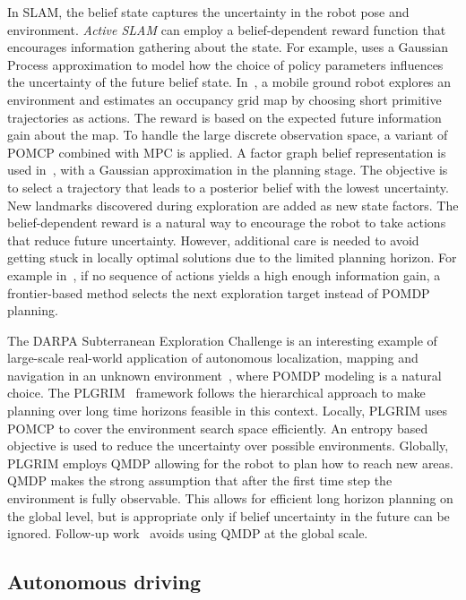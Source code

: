 \documentclass[journal]{IEEEtran}
\begin{document}
In SLAM, the belief state captures the uncertainty in the robot pose and environment.
\emph{Active SLAM} can employ a belief-dependent reward  function that encourages
information gathering about the state. For example, \cite{martinez2009bayesian} uses a Gaussian Process approximation to model how the
choice of policy parameters influences the uncertainty of the future belief state.
In~\cite{lauri2016planning}, a mobile ground robot explores an environment and estimates an occupancy grid map by choosing short
primitive trajectories as actions. The reward is based on the expected
future information gain about the map. To handle the large discrete
observation space, a variant of POMCP combined with MPC {is} applied.
A factor graph belief representation is used in~\cite{kopitkov2017no}, with a Gaussian approximation in the planning stage.
The objective is to select a trajectory that leads to a posterior belief with the lowest uncertainty.
{New landmarks discovered during exploration are added as new state factors.}
{The belief-dependent reward is a natural way to encourage the robot to take actions that reduce future uncertainty.
However, additional care is needed to avoid getting stuck in locally optimal solutions due to the limited planning horizon.
For example in~\cite{lauri2016planning}, if no sequence of actions yields a high enough information gain, a frontier-based method selects the next exploration target instead of POMDP planning.
}

{The DARPA Subterranean Exploration Challenge is an
  interesting example of large-scale real-world application of
  autonomous localization, mapping and navigation in an unknown
  environment~\cite{cao2021tare}, where POMDP modeling is a natural
  choice. The PLGRIM~\cite{kim2021plgrim} framework follows the
  hierarchical approach to make planning over long time horizons
  feasible in this context. Locally, PLGRIM uses POMCP to cover the environment search
  space efficiently. An entropy based objective is used to
  reduce the uncertainty over possible
  environments. Globally, PLGRIM employs
  QMDP allowing for the robot to plan how to reach
  new areas. QMDP makes the strong assumption that
  after the first time step the environment is fully observable.
  This allows for efficient long horizon planning on the global level, but is appropriate only if belief
  uncertainty in the future can be ignored.
  Follow-up work~\cite{peltzer2022fig} avoids using QMDP at the global scale.}

%
\subsection{Autonomous driving}
\label{sec:autonomousdriving}
\end{document}
